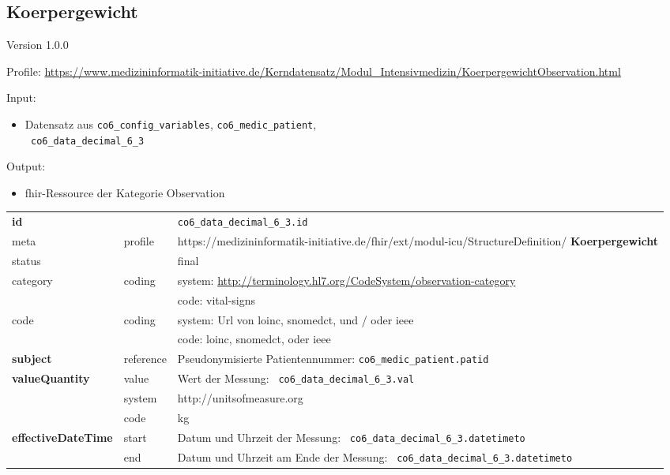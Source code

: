 \subsection{
Koerpergewicht} 
\noindent Version 1.0.0

\noindent Profile: \url{https://www.medizininformatik-initiative.de/Kerndatensatz/Modul_Intensivmedizin/KoerpergewichtObservation.html}

\noindent Input:
\begin{itemize}
	\item Datensatz aus \texttt{co6\_config\_variables}, \texttt{co6\_medic\_patient}, \\ \texttt{
co6\_data\_decimal\_6\_3}
\end{itemize}
Output:
\begin{itemize}
        \item \ac{fhir}-Ressource der Kategorie \glqq Observation\grqq{}
\end{itemize}
\begin{longtable}{|l|l|p{7.5cm}|}
        \hline
        \rowcolor{lightgray} \multicolumn{3}{|l|}{Data Mapping (inhaltlich)} \\ \hline
        \textbf{id} &  & \texttt{co6\_data\_decimal\_6\_3.id} \\ \hline
	meta & profile & https://medizininformatik-initiative.de/fhir/ext/modul-icu/StructureDefinition/\textbf{
Koerpergewicht} \\ \hline 
	status &  & final   \\ \hline 
	category & coding & system: \url{http://terminology.hl7.org/CodeSystem/observation-category} \\
\cline{3-3}
	& & code: vital-signs \\ \hline
	code & coding & system: Url von \ac{loinc}, \ac{snomedct}, und / oder \ac{ieee} \\ 
	\cline{3-3} 
	 &  & code: \ac{loinc}, \ac{snomedct}, oder \ac{ieee} \\ \hline
	 \textbf{subject}  & reference & Pseudonymisierte Patientennummer: \texttt{co6\_medic\_patient.patid} \\ \hline
	 \textbf{valueQuantity}  & value & Wert der Messung: \texttt{
co6\_data\_decimal\_6\_3.val} \\
        \cline{2-3}
         & system & http://unitsofmeasure.org \\
         \cline{2-3}
         & code & kg \\ \hline
     \textbf{effectiveDateTime}  & start & Datum und Uhrzeit der Messung: \texttt{
co6\_data\_decimal\_6\_3.datetimeto} \\
    \cline{2-3}
     & end & Datum und Uhrzeit am Ende der Messung: \texttt{
co6\_data\_decimal\_6\_3.datetimeto} \\ \hline
\end{longtable}


